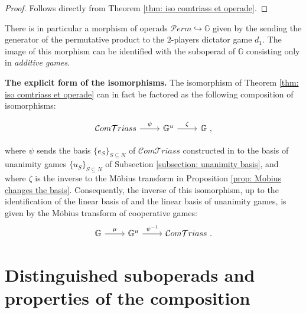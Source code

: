 \documentclass[a4paper,12pt]{amsart}
\begin{document}
\begin{proof}
Follows directly from Theorem \ref{thm: iso comtriass et operade}. 
\end{proof}

\begin{remark}
There is in particular a morphism of operads $\mathcal{P}erm \hookrightarrow \mathbb{G}$ given by the sending the generator of the permutative product to the $2$-players dictator game $d_1$. The image of this morphism can be identified with the suboperad of $\mathbb{G}$ consisting only in \textit{additive games}. 
\end{remark}

\textbf{The explicit form of the isomorphisms.} The isomorphism of Theorem \ref{thm: iso comtriass et operade} can in fact be factored as the following composition of isomorphisms:

\[
\begin{tikzcd}
\mathcal{C}om\mathcal{T}riass \arrow[r,"\psi"]
&\mathbb{G}^{u} \arrow[r,"\zeta"]
&\mathbb{G}~,
\end{tikzcd}
\]
\vspace{0.1pc}

where $\psi$ sends the basis $\{e_S\}_{S \subseteq N}$ of $\mathcal{C}om\mathcal{T}riass$ constructed in \cite[Theorem 14]{Vallettepartition} to the basis of unanimity games $\{u_S\}_{S \subseteq N}$ of Subsection \ref{subsection: unanimity basis}, and where $\zeta$ is the inverse to the Möbius transform in Proposition \ref{prop: Mobius changes the basis}. Consequently, the inverse of this isomorphism, up to the identification of the linear basis of \cite[Theorem 14]{Vallettepartition} and the linear basis of unanimity games, is given by the Möbius transform of cooperative games: 
\[
\begin{tikzcd}
\mathbb{G} \arrow[r,"\mu"]
&\mathbb{G}^{u} \arrow[r,"\psi^{-1}"]
&\mathcal{C}om\mathcal{T}riass~.
\end{tikzcd}
\]

\vspace{1.5pc}

\section{Distinguished suboperads and properties of the composition}

\vspace{2pc}
\end{document}
